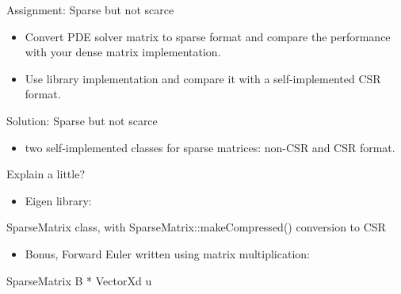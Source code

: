 \documentclass[aspectratio=169,xcolor=dvipsnames]{beamer}
\begin{document}

\begin{frame}{Assignment: Sparse but not scarce}
	\begin{itemize}
	    \item Convert PDE solver matrix to sparse format and compare the performance with your
	dense matrix implementation.
		\item Use library implementation and compare it with a self-implemented CSR format.

	\end{itemize}
\end{frame}


\begin{frame}{Solution: Sparse but not scarce}
	\begin{itemize}
		\item two self-implemented classes for sparse matrices: non-CSR and CSR format.
	\end{itemize}
	
\centerline{Explain a little?}

	\begin{itemize}
		\item Eigen library:
	\end{itemize}
	
\centerline{SparseMatrix class, with SparseMatrix::makeCompressed() conversion to CSR} 

	\begin{itemize}
		\item Bonus, Forward Euler written using matrix multiplication: 
	\end{itemize}
	
 \centerline{SparseMatrix B * VectorXd u} 
    
	
\end{frame}
\end{document}
